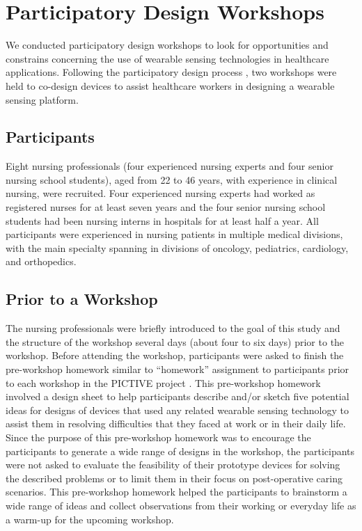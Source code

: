 \section{Participatory Design Workshops}
We conducted participatory design workshops to look for opportunities and constrains concerning the use of wearable sensing technologies in healthcare applications. Following the participatory design process \cite{Greenbaum:1992:DWC:125470, Muller:2002:PDT:772072.772138}, two workshops were held to co-design devices to assist healthcare workers in designing a wearable sensing platform.

\subsection{Participants}
Eight nursing professionals (four experienced nursing experts and four senior nursing school students), aged from 22 to 46 years, with experience in clinical nursing, were recruited. Four experienced nursing experts had worked as registered nurses for at least seven years and the four senior nursing school students had been nursing interns in hospitals for at least half a year. All participants were experienced in nursing patients in multiple medical divisions, with the main specialty spanning in divisions of oncology, pediatrics, cardiology, and orthopedics.

\subsection{Prior to a Workshop}
The nursing professionals were briefly introduced to the goal of this study and the structure of the workshop several days (about four to six days) prior to the workshop. Before attending the workshop, participants were asked to finish the pre-workshop homework similar to “homework” assignment to participants prior to each workshop in the PICTIVE project \cite{Muller:1991:PEP:108844.108896}. This pre-workshop homework involved a design sheet to help participants describe and/or sketch five potential ideas for designs of devices that used any related wearable sensing technology to assist them in resolving difficulties that they faced at work or in their daily life. Since the purpose of this pre-workshop homework was to encourage the participants to generate a wide range of designs in the workshop, the participants were not asked to evaluate the feasibility of their prototype devices for solving the described problems or to limit them in their focus on post-operative caring scenarios. This pre-workshop homework helped the participants to brainstorm a wide range of ideas and collect observations from their working or everyday life as a warm-up for the upcoming workshop.


